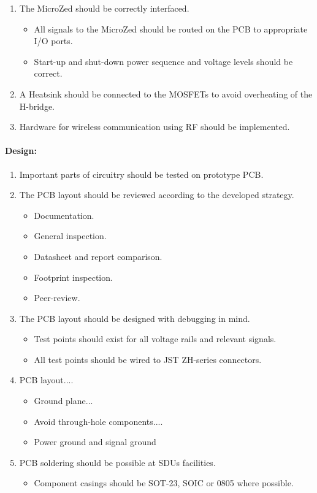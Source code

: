 \begin{enumerate}[resume]
	\item The MicroZed should be correctly interfaced.
	\label{enum:microzed_interface}
	\begin{itemize}
		\item All signals to the MicroZed should be routed on the PCB to appropriate I/O ports.
		\item Start-up and shut-down power sequence and voltage levels should be correct.
	\end{itemize}
	\item A Heatsink should be connected to the MOSFETs to avoid overheating of the H-bridge.
	\label{enum:cool_mosfets}
	\item Hardware for wireless communication using RF should be implemented.
	\label{enum:hardware_for_wireless_implemented}
\end{enumerate}


\paragraph{Design:}
\begin{enumerate}[resume]
	\item Important parts of circuitry should be tested on prototype PCB.
	\label{enum:important_prototype}
	\item The PCB layout should be reviewed according to the developed strategy.
	\label{enum:pcb_strategy}
	\begin{itemize}
		\item Documentation.
		\item General inspection.
		\item Datasheet and report comparison.
		\item Footprint inspection.
		\item Peer-review.
	\end{itemize}
	\item The PCB layout should be designed with debugging in mind.
	\label{enum:pcb_debugging}
	\begin{itemize}
		\item Test points should exist for all voltage rails and relevant signals.
		\item All test points should be wired to JST ZH-series connectors.
	\end{itemize}
	\item PCB layout....
	\label{enum:pcb_layout}
	\begin{itemize}
		\item Ground plane...
		\item Avoid through-hole components....
		\item Power ground and signal ground
	\end{itemize}
	\item PCB soldering should be possible at SDUs facilities.
	\label{enum:pcb_soldering}
	\begin{itemize}
		\item Component casings should be SOT-23, SOIC or 0805 where possible.
	\end{itemize}
\end{enumerate}


